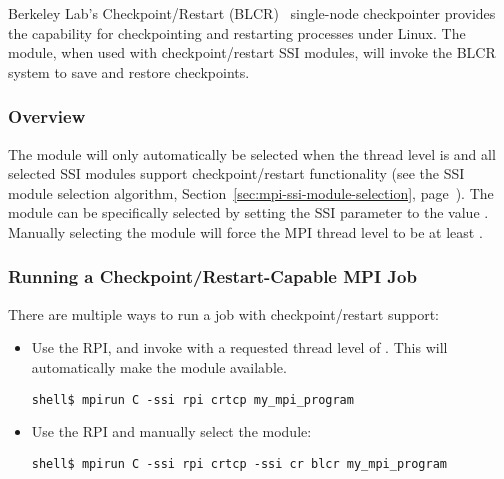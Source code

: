 Berkeley Lab's Checkpoint/Restart (BLCR)~\cite{BLCR02} single-node
checkpointer provides the capability for checkpointing and restarting
processes under Linux.  The  module, when used with
checkpoint/restart SSI modules, will invoke the BLCR system to save
and restore checkpoints.


\subsubsection{Overview}

The  module will only automatically be selected when the
thread level is  and all
selected SSI modules support checkpoint/restart functionality (see the
SSI module selection algorithm,
Section~\ref{sec:mpi-ssi-module-selection},
page~\pageref{sec:mpi-ssi-module-selection}).  The  module
can be specifically selected by setting the  SSI
parameter to the value .  Manually selecting the
 module will force the MPI thread level to be at least
.


\subsubsection{Running a Checkpoint/Restart-Capable MPI Job}

There are multiple ways to run a job with checkpoint/restart support:

\begin{itemize}
\item Use the  RPI, and invoke
   with a requested thread level of
  .  This will automatically
  make the  module available.

\lstset{style=lam-cmdline}
\begin{lstlisting}
shell$ mpirun C -ssi rpi crtcp my_mpi_program
\end{lstlisting}
  
\item Use the  RPI and manually select the 
  module:

\lstset{style=lam-cmdline}
\begin{lstlisting}
shell$ mpirun C -ssi rpi crtcp -ssi cr blcr my_mpi_program
\end{lstlisting}
\end{itemize}

